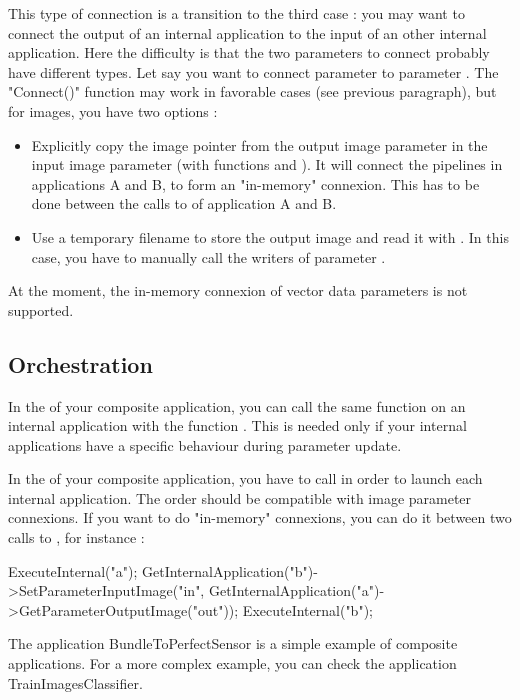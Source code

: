 This type of connection is a transition to the third case : you may want to connect
the output of an internal application to the input of an other internal application.
Here the difficulty is that the two parameters to connect probably have different
types. Let say you want to connect parameter  to parameter .
The "Connect()" function may work in favorable cases (see previous paragraph),
but for images, you have two options :
\begin{itemize}
\item Explicitly copy the image pointer from the output image parameter in the input
image parameter (with functions  and
). It will connect the pipelines in applications
A and B, to form an "in-memory" connexion. This has to be done between the calls
to  of application A and B.
\item Use a temporary filename to store the output image  and read it
with . In this case, you have to manually call the writers of parameter
.
\end{itemize}

At the moment, the in-memory connexion of vector data parameters is not supported.

\subsection{Orchestration}

In the  of your composite application, you can call
the same function on an internal application with the function .
This is needed only if your internal applications have a specific behaviour during
parameter update.

In the  of your composite application, you have to call 
in order to launch each internal application. The order should be compatible with
image parameter connexions. If you want to do "in-memory" connexions, you can do it between
two calls to , for instance :

\begin{cppcode}
ExecuteInternal("a");
GetInternalApplication("b")->SetParameterInputImage("in",
  GetInternalApplication("a")->GetParameterOutputImage("out"));
ExecuteInternal("b");
\end{cppcode}

The application BundleToPerfectSensor is a simple example of composite applications.
For a more complex example, you can check the application TrainImagesClassifier.

